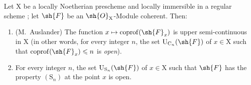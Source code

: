 \begin{proposition}[6.11.2]
\label{IV.6.11.2}
Let $\mathrm{X}$ be a locally Noetherian prescheme and locally immersible
in a regular scheme ; let $\sh{F}$ be an $\sh{O}_\mathrm{X}$-Module coherent. Then:
\begin{enumerate}[label=(\roman*)]
  \item \textnormal{(M.~Auslander)} The function $x\mapsto\operatorname{coprof}(\sh{F}_x)$ is upper semi-continuous in $\mathrm{X}$
(in other words, for every integer $n$, the set $\mathrm{U}_{\mathrm{C}_n}(\sh{F})$ of $x\in\mathrm{X}$ such that $\operatorname{coprof}(\sh{F}_x)\leqslant n$
is \emph{open}).
  \item For every integer $n$, the set $\mathrm{U}_{\mathrm{S}_n}(\sh{F})$ of $x\in\mathrm{X}$ such that $\sh{F}$ has the property $(\mathrm{S}_n)$
at the point $x$ is open.
\end{enumerate}
\end{proposition}

